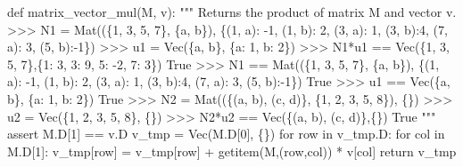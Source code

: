 \documentclass[
  letterpaper,
  DIV=11,
  numbers=noendperiod]{scrartcl}
\newenvironment{Shaded}{\begin{snugshade}}{\end{snugshade}}
\newcommand{\CommentTok}[1]{\textcolor[rgb]{0.37,0.37,0.37}{#1}}
\newcommand{\ControlFlowTok}[1]{\textcolor[rgb]{0.00,0.23,0.31}{#1}}
\newcommand{\DecValTok}[1]{\textcolor[rgb]{0.68,0.00,0.00}{#1}}
\newcommand{\KeywordTok}[1]{\textcolor[rgb]{0.00,0.23,0.31}{#1}}
\newcommand{\NormalTok}[1]{\textcolor[rgb]{0.00,0.23,0.31}{#1}}
\newcommand{\OperatorTok}[1]{\textcolor[rgb]{0.37,0.37,0.37}{#1}}
\begin{document}
\begin{Shaded}
\begin{Highlighting}[numbers=left,,]
\KeywordTok{def}\NormalTok{ matrix\_vector\_mul(M, v):}
    \CommentTok{"""}
\CommentTok{    Returns the product of matrix M and vector v.}
\CommentTok{    \textgreater{}\textgreater{}\textgreater{} N1 = Mat((\{1, 3, 5, 7\}, \{\textquotesingle{}a\textquotesingle{}, \textquotesingle{}b\textquotesingle{}\}), \{(1, \textquotesingle{}a\textquotesingle{}): {-}1, (1, \textquotesingle{}b\textquotesingle{}): 2, (3, \textquotesingle{}a\textquotesingle{}): 1, (3, \textquotesingle{}b\textquotesingle{}):4, (7, \textquotesingle{}a\textquotesingle{}): 3, (5, \textquotesingle{}b\textquotesingle{}):{-}1\})}
\CommentTok{    \textgreater{}\textgreater{}\textgreater{} u1 = Vec(\{\textquotesingle{}a\textquotesingle{}, \textquotesingle{}b\textquotesingle{}\}, \{\textquotesingle{}a\textquotesingle{}: 1, \textquotesingle{}b\textquotesingle{}: 2\})}
\CommentTok{    \textgreater{}\textgreater{}\textgreater{} N1*u1 == Vec(\{1, 3, 5, 7\},\{1: 3, 3: 9, 5: {-}2, 7: 3\})}
\CommentTok{    True}
\CommentTok{    \textgreater{}\textgreater{}\textgreater{} N1 == Mat((\{1, 3, 5, 7\}, \{\textquotesingle{}a\textquotesingle{}, \textquotesingle{}b\textquotesingle{}\}), \{(1, \textquotesingle{}a\textquotesingle{}): {-}1, (1, \textquotesingle{}b\textquotesingle{}): 2, (3, \textquotesingle{}a\textquotesingle{}): 1, (3, \textquotesingle{}b\textquotesingle{}):4, (7, \textquotesingle{}a\textquotesingle{}): 3, (5, \textquotesingle{}b\textquotesingle{}):{-}1\})}
\CommentTok{    True}
\CommentTok{    \textgreater{}\textgreater{}\textgreater{} u1 == Vec(\{\textquotesingle{}a\textquotesingle{}, \textquotesingle{}b\textquotesingle{}\}, \{\textquotesingle{}a\textquotesingle{}: 1, \textquotesingle{}b\textquotesingle{}: 2\})}
\CommentTok{    True}
\CommentTok{    \textgreater{}\textgreater{}\textgreater{} N2 = Mat((\{(\textquotesingle{}a\textquotesingle{}, \textquotesingle{}b\textquotesingle{}), (\textquotesingle{}c\textquotesingle{}, \textquotesingle{}d\textquotesingle{})\}, \{1, 2, 3, 5, 8\}), \{\})}
\CommentTok{    \textgreater{}\textgreater{}\textgreater{} u2 = Vec(\{1, 2, 3, 5, 8\}, \{\})}
\CommentTok{    \textgreater{}\textgreater{}\textgreater{} N2*u2 == Vec(\{(\textquotesingle{}a\textquotesingle{}, \textquotesingle{}b\textquotesingle{}), (\textquotesingle{}c\textquotesingle{}, \textquotesingle{}d\textquotesingle{})\},\{\})}
\CommentTok{    True}
\CommentTok{    """}
    \ControlFlowTok{assert}\NormalTok{ M.D[}\DecValTok{1}\NormalTok{] }\OperatorTok{==}\NormalTok{ v.D}
\NormalTok{    v\_tmp }\OperatorTok{=}\NormalTok{ Vec(M.D[}\DecValTok{0}\NormalTok{], \{\})}
    \ControlFlowTok{for}\NormalTok{ row }\KeywordTok{in}\NormalTok{ v\_tmp.D:}
        \ControlFlowTok{for}\NormalTok{ col }\KeywordTok{in}\NormalTok{ M.D[}\DecValTok{1}\NormalTok{]:}
\NormalTok{            v\_tmp[row] }\OperatorTok{=}\NormalTok{ v\_tmp[row] }\OperatorTok{+}\NormalTok{ getitem(M,(row,col)) }\OperatorTok{*}\NormalTok{ v[col] }
    \ControlFlowTok{return}\NormalTok{ v\_tmp}


\end{Highlighting}
\end{Shaded}
\end{document}

